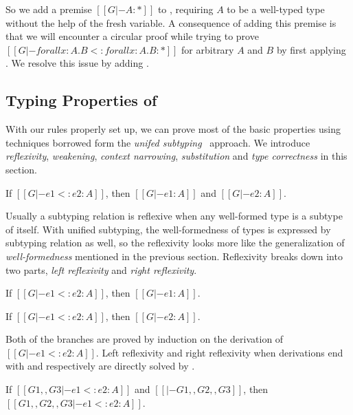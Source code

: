 So we add a premise $[[G |- A : *]]$ to ,
requiring $A$ to be a well-typed type without the help of the fresh variable.
A consequence of adding this premise is that we will encounter a circular proof
while trying to prove $[[G |- forall x : A. B <: forall x : A . B : *]]$ for
arbitrary $A$ and $B$ by first applying . We resolve this issue by
adding .

\subsection{Typing Properties of \name}

With our rules properly set up, we can prove most of the basic properties
using techniques borrowed form the \emph{unifed subtyping}~\cite{yang2017unifying} approach.
We introduce \emph{reflexivity}, \emph{weakening},
\emph{context narrowing}, \emph{substitution} and \emph{type correctness}
in this section.

\begin{theorem}[Reflexivity]
   If $[[G |- e1 <: e2 : A]]$,
   then $[[G |- e1 : A]]$ and $[[G |- e2 : A]]$.
\end{theorem}

Usually a subtyping relation is reflexive when any well-formed type is a subtype
of itself. With unified subtyping, the well-formedness of types is expressed by
subtyping relation as well, so the reflexivity looks more like the generalization
of \emph{well-formedness} mentioned in the previous section. Reflexivity
breaks down into two parts, \emph{left reflexivity} and \emph{right reflexivity}.

\begin{lemma}
   If $[[G |- e1 <: e2 : A]]$,
   then $[[G |- e1 : A]]$.
\end{lemma}

\begin{lemma}
   If $[[G |- e1 <: e2 : A]]$,
   then $[[G |- e2 : A]]$.
\end{lemma}

\noindent Both of the branches are proved by induction on the derivation of
$[[G |- e1 <: e2 : A]]$.
Left reflexivity and right reflexivity when derivations end with 
and  respectively are directly solved by .

\begin{theorem}[Weakening]
    If $[[G1 ,, G3 |- e1 <: e2 : A]]$ and $[[|- G1 ,, G2 ,, G3]]$,
    then $[[G1 ,, G2 ,, G3 |- e1 <: e2 : A]]$.
\end{theorem}

